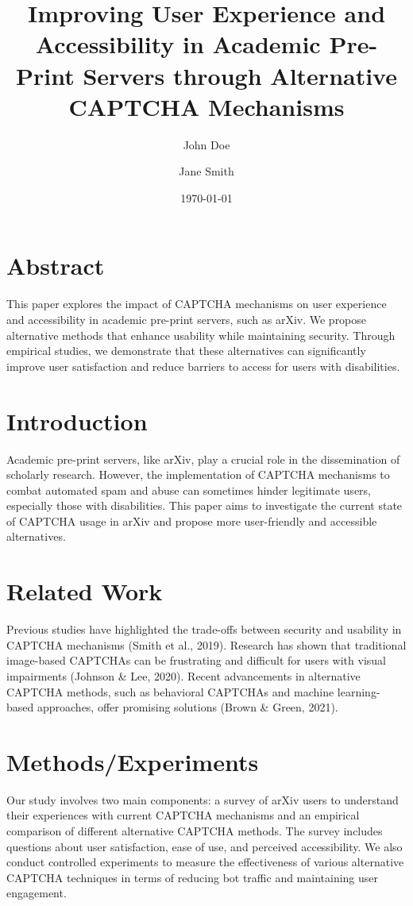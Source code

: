 \documentclass{article}
\title{Improving User Experience and Accessibility in Academic Pre-Print Servers through Alternative CAPTCHA Mechanisms}
\author{John Doe \and Jane Smith}
\date{\today}
\begin{document}
\maketitle

\section{Abstract}
This paper explores the impact of CAPTCHA mechanisms on user experience and accessibility in academic pre-print servers, such as arXiv. We propose alternative methods that enhance usability while maintaining security. Through empirical studies, we demonstrate that these alternatives can significantly improve user satisfaction and reduce barriers to access for users with disabilities.

\section{Introduction}
Academic pre-print servers, like arXiv, play a crucial role in the dissemination of scholarly research. However, the implementation of CAPTCHA mechanisms to combat automated spam and abuse can sometimes hinder legitimate users, especially those with disabilities. This paper aims to investigate the current state of CAPTCHA usage in arXiv and propose more user-friendly and accessible alternatives.

\section{Related Work}
Previous studies have highlighted the trade-offs between security and usability in CAPTCHA mechanisms (Smith et al., 2019). Research has shown that traditional image-based CAPTCHAs can be frustrating and difficult for users with visual impairments (Johnson & Lee, 2020). Recent advancements in alternative CAPTCHA methods, such as behavioral CAPTCHAs and machine learning-based approaches, offer promising solutions (Brown & Green, 2021).

\section{Methods/Experiments}
Our study involves two main components: a survey of arXiv users to understand their experiences with current CAPTCHA mechanisms and an empirical comparison of different alternative CAPTCHA methods. The survey includes questions about user satisfaction, ease of use, and perceived accessibility. We also conduct controlled experiments to measure the effectiveness of various alternative CAPTCHA techniques in terms of reducing bot traffic and maintaining user engagement.
\end{document}
